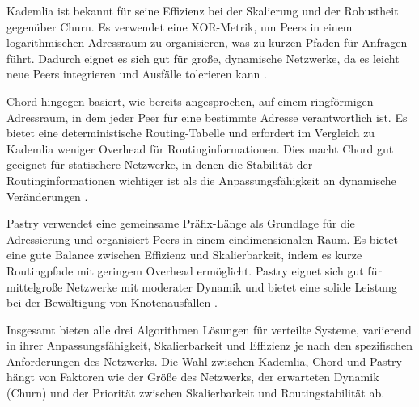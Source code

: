 Kademlia ist bekannt für seine Effizienz bei der Skalierung und der Robustheit gegenüber Churn. Es verwendet eine XOR-Metrik, um Peers in einem logarithmischen Adressraum zu organisieren, was zu kurzen Pfaden für Anfragen führt. Dadurch eignet es sich gut für große, dynamische Netzwerke, da es leicht neue Peers integrieren und Ausfälle tolerieren kann \Parencite{MedranoChavez_ChordKademliaHighChurnScenarios}.

Chord hingegen basiert, wie bereits angesprochen, auf einem ringförmigen Adressraum, in dem jeder Peer für eine bestimmte Adresse verantwortlich ist. Es bietet eine deterministische Routing-Tabelle und erfordert im Vergleich zu Kademlia weniger Overhead für Routinginformationen. Dies macht Chord gut geeignet für statischere Netzwerke, in denen die Stabilität der Routinginformationen wichtiger ist als die Anpassungsfähigkeit an dynamische Veränderungen \parencite{Stoica_Chord}.

Pastry verwendet eine gemeinsame Präfix-Länge als Grundlage für die Adressierung und organisiert Peers in einem eindimensionalen Raum. Es bietet eine gute Balance zwischen Effizienz und Skalierbarkeit, indem es kurze Routingpfade mit geringem Overhead ermöglicht. Pastry eignet sich gut für mittelgroße Netzwerke mit moderater Dynamik und bietet eine solide Leistung bei der Bewältigung von Knotenausfällen \parencite{Rowstron_Pastry}.

Insgesamt bieten alle drei Algorithmen Lösungen für verteilte Systeme, variierend in ihrer Anpassungsfähigkeit, Skalierbarkeit und Effizienz je nach den spezifischen Anforderungen des Netzwerks. Die Wahl zwischen Kademlia, Chord und Pastry hängt von Faktoren wie der Größe des Netzwerks, der erwarteten Dynamik (Churn) und der Priorität zwischen Skalierbarkeit und Routingstabilität ab.




